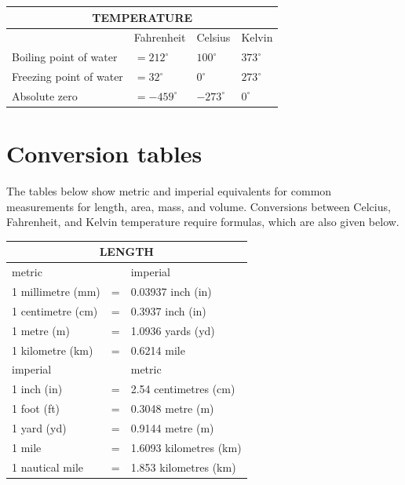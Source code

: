 \documentclass[10pt]{article}
\begin{document}
\begin{center}
\begin{tabular}{|llll|}
\hline
\multicolumn{4}{c|}{TEMPERATURE} \\
\hline
 & \multicolumn{1}{c}{Fahrenheit} & Celsius & Kelvin \\
\hline
Boiling point of water & $=212^{\circ}$ & $100^{\circ}$ & $373^{\circ}$ \\
\hline
Freezing point of water & $=32^{\circ}$ & $0^{\circ}$ & $273^{\circ}$ \\
\hline
Absolute zero & $=-459^{\circ}$ & $-273^{\circ}$ & $0^{\circ}$ \\
\hline
\end{tabular}
\end{center}

\section*{Conversion tables}
The tables below show metric and imperial equivalents for common measurements for length, area, mass, and volume. Conversions between Celcius, Fahrenheit, and Kelvin temperature require formulas, which are also given below.

\begin{center}
\begin{tabular}{|l|l|l|}
\hline
\multicolumn{3}{|c|}{LENGTH} \\
\hline
metric &  & imperial \\
\hline
1 millimetre (mm) & = & 0.03937 inch (in) \\
\hline
1 centimetre (cm) & = & 0.3937 inch (in) \\
\hline
1 metre (m) & = & 1.0936 yards (yd) \\
\hline
1 kilometre (km) & = & 0.6214 mile \\
\hline
imperial &  & metric \\
\hline
1 inch (in) & = & 2.54 centimetres (cm) \\
\hline
1 foot (ft) & = & 0.3048 metre (m) \\
\hline
1 yard (yd) & = & 0.9144 metre (m) \\
\hline
1 mile & = & 1.6093 kilometres (km) \\
\hline
1 nautical mile & = & 1.853 kilometres (km) \\
\hline
\end{tabular}
\end{center}
\end{document}
